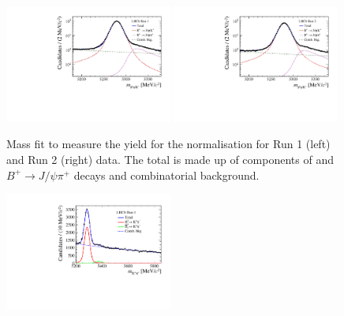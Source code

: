 {\begin{figure}[tbp]
    \centering
        \includegraphics[width=  0.49\textwidth]{./Figs/BFAnalysis/BuJpsiK_Run1.pdf}
       \includegraphics[width=0.49\textwidth]{./Figs/BFAnalysis/BuJpsiK_Run2.pdf}
    \caption{ Mass fit to measure the \bujpsik yield for the normalisation for Run 1 (left) and Run 2 (right) data. The total \pdf is made up of components of \bujpsik and $B^{+} \to J/\psi \pi^{+}$ decays and combinatorial background.}
    \label{fig:Bujpsikyield}
\end{figure}
\begin{figure}[tbp]
    \centering
        \includegraphics[width=  0.49\textwidth]{./Figs/BFAnalysis/Bd2KPi_mass_RunI_BDTbinNone.pdf}

\end{figure}}
